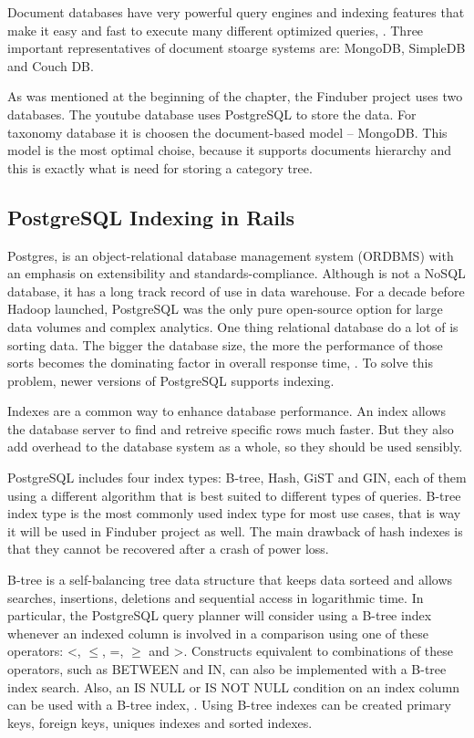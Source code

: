 Document databases have very powerful query engines and indexing features that make it easy and fast to execute many different optimized queries, \cite{mongodb-adv}. Three important representatives of document stoarge systems are: MongoDB, SimpleDB and Couch DB. 

As was mentioned at the beginning of the chapter, the Finduber project uses two databases. The youtube database uses PostgreSQL to store the data. For taxonomy database it is choosen the document-based model -- MongoDB. This model is the most optimal choise, because it supports documents hierarchy and this is exactly what is need for storing a category tree.

\subsection{PostgreSQL Indexing in Rails}

Postgres, is an object-relational database management system (ORDBMS) with an emphasis on extensibility and standards-compliance. Although is not a NoSQL database, it has a long track record of use in data warehouse. For a decade before Hadoop launched, PostgreSQL was the only pure open-source option for large data volumes and complex analytics. One thing relational database do a lot of is sorting data. The bigger the database size, the more the performance of those sorts becomes the dominating factor in overall response time, \cite{whypostgres}. To solve this problem, newer versions of PostgreSQL supports indexing. 

Indexes are a common way to enhance database performance. An index allows the database server to find and retreive specific rows much faster. But they also add overhead to the database system as a whole, so they should be used sensibly.

PostgreSQL includes four index types: B-tree, Hash, GiST and GIN, each of them using a different algorithm that is best suited to different types of queries. B-tree index type is the most commonly used index type for most use cases, that is way it will be used in Finduber project as well. The main drawback of hash indexes is that they cannot be recovered after a crash of power loss. 

B-tree is a self-balancing tree data structure that keeps data sorteed and allows searches, insertions, deletions and sequential access in logarithmic time. In particular, the PostgreSQL query planner will consider using a B-tree index whenever an indexed column is involved in a comparison using one of these operators: \textless, $\leq$, =, $\geq$ and \textgreater. Constructs equivalent to combinations of these operators, such as BETWEEN and IN, can also be implemented with a B-tree index search. Also, an IS NULL or IS NOT NULL condition on an index column can be used with a B-tree index, \cite{postgresweb}. Using B-tree indexes can be created primary keys, foreign keys, uniques indexes and sorted indexes. 

